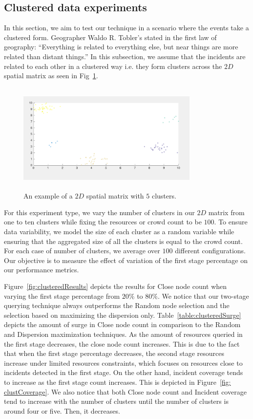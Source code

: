 \documentclass{acm_proc_article-sp}
\begin{document}
\subsection{Clustered data experiments}
In this section, we aim to test our technique in a scenario where the events take a clustered form. Geographer Waldo R. Tobler's stated in the first law of geography: ``Everything is related to everything else, but near things are more related than distant things.'' In this subsection, we assume that the incidents are related to each other in a clustered way i.e. they form clusters across the $2D$ spatial matrix as seen in Fig~\ref{fig: clust}. \par
\begin{figure}[!h]
\centering
 \includegraphics[width=9cm ,height=5.5cm]{figuresPng/clust.png}
 \caption{An example of a $2D$ spatial matrix with $5$ clusters.}\label{fig: clust}
\end{figure}
For this experiment type, we vary the number of clusters in our $2D$ matrix from one to ten clusters while fixing the resources or crowd count to be $100$. To ensure data variability, we model the size of each cluster as a random variable while ensuring that the aggregated size of all the clusters is equal to the crowd count. For each case of number of clusters, we average over $100$ different configurations. Our objective is to measure the effect of variation of the first stage percentage on our performance metrics.\par
Figure~\ref{fig:clusteredResults} depicts the results for Close node count when varying the first stage percentage from $20\%$ to $80\%$. We notice that our two-stage querying technique always outperforms the Random node selection and the selection based on maximizing the dispersion only. Table~\ref{table:clusteredSurge} depicts the amount of surge in Close node count in comparison to the Random and Dispersion maximization techniques. As the amount of resources queried in the first stage decreases, the close node count increases. This is due to the fact that when the first stage percentage decreases, the second stage resources increase under limited resources constraints, which focuses on resources close to incidents detected in the first stage. On the other hand, incident coverage tends to increase as the first stage count increases. This is depicted in Figure~\ref{fig: clustCoverage}. We also notice that both Close node count and Incident coverage tend to increase with the number of clusters until the number of clusters is around four or five. Then, it decreases.
\end{document}
